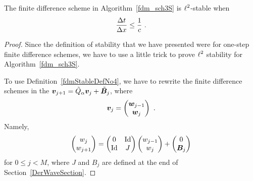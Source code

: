 \begin{prop}\label{CFLCondProp}
The finite difference scheme in Algorithm~\ref{fdm_sch3S} is
$\displaystyle \ell^2$-stable when
\[
\frac{\dtx{t}}{\dtx{x}} \leq \frac{1}{c} \ .
\]
\end{prop}

\begin{proof}
Since the definition of stability that we have presented were for
one-step finite difference schemes, we have to use a little trick to
prove $\displaystyle \ell^2$ stability for Algorithm~\ref{fdm_sch3S}.

To use Definition~\ref{fdmStableDefNo4}, we have to rewrite the finite
difference schemes in the
$\bm{v}_{j+1} = \tilde{Q}_\alpha\bm{v}_j + \tilde{\bm{B}}_j$,
where 
\[
\bm{v}_j = \begin{pmatrix} \bm{w}_{j-1} \\ \bm{w}_j \end{pmatrix} \ .
\]
Namely,
\[
\begin{pmatrix}
w_j \\ w_{j+1}
\end{pmatrix}
=
\begin{pmatrix}
0 & \operatorname{Id} \\ \operatorname{Id} & J  \\ 
\end{pmatrix}
\begin{pmatrix}
w_{j-1} \\ w_j
\end{pmatrix}
+
\begin{pmatrix}
0 \\ \bm{B}_j
\end{pmatrix}
\]
for $0 \leq j < M$, where $J$ and $B_j$ are defined at the end of
Section~\ref{DerWaveSection}.


\end{proof}
